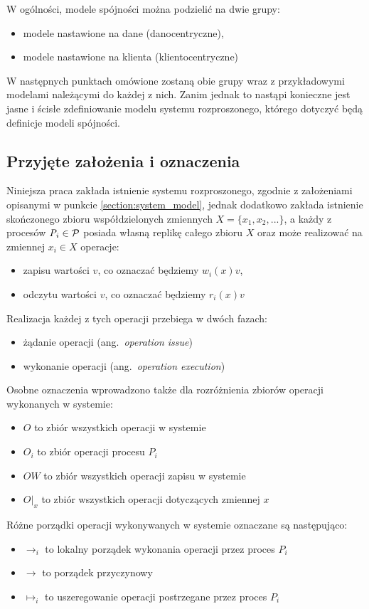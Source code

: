 W ogólności, modele spójności można podzielić na dwie grupy:
\begin{itemize}
    \item modele nastawione na dane (danocentryczne),
    \item modele nastawione na klienta (klientocentryczne)
\end{itemize}
W następnych punktach omówione zostaną obie grupy wraz z przykładowymi modelami należącymi do każdej z nich. Zanim jednak to nastąpi konieczne jest jasne i ścisłe zdefiniowanie modelu systemu rozproszonego, którego dotyczyć będą definicje modeli spójności.

\subsection{Przyjęte założenia i oznaczenia}

Niniejsza praca zakłada istnienie systemu rozproszonego, zgodnie z założeniami opisanymi w punkcie \ref{section:system_model}, jednak dodatkowo zakłada istnienie skończonego zbioru współdzielonych zmiennych $ X = \{x_1, x_2, ...\} $, a każdy z procesów $ \emph{P}_i \in \mathcal{P} $ posiada własną replikę całego zbioru $ X $ oraz może realizować na zmiennej $ x_i \in X $ operacje:
\begin{itemize}
    \item zapisu wartości $ v $, co oznaczać będziemy $ w_i(x)v $,
    \item odczytu wartości $ v $, co oznaczać będziemy $ r_i(x)v $
\end{itemize}
Realizacja każdej z tych operacji przebiega w dwóch fazach:
\begin{itemize}
    \item żądanie operacji (ang.\ \textit{operation issue})
    \item wykonanie operacji (ang.\ \textit{operation execution})
\end{itemize}
Osobne oznaczenia wprowadzono także dla rozróżnienia zbiorów operacji wykonanych w systemie:
\begin{itemize}
    \item $ O $ to zbiór wszystkich operacji w systemie
    \item $ O_i $ to zbiór operacji procesu $ P_i $
    \item $ OW $ to zbiór wszystkich operacji zapisu w systemie
    \item $ O|_x $ to zbiór wszystkich operacji dotyczących zmiennej $ x $
\end{itemize}
Różne porządki operacji wykonywanych w systemie oznaczane są następująco:
\begin{itemize}
    \item $ \rightarrow_i $ to lokalny porządek wykonania operacji przez proces $ P_i $
    \item $ \rightarrow $ to porządek przyczynowy
    \item $ \mapsto_i $ to uszeregowanie operacji postrzegane przez proces $ P_i $
\end{itemize}

